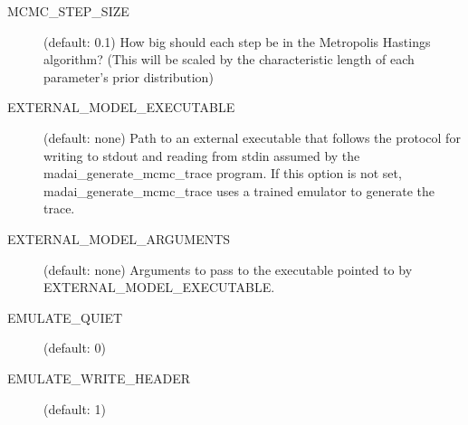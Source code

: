 \begin{description}
    \item[MCMC\_STEP\_SIZE] (default: 0.1) How big should each step be in the Metropolis Hastings algorithm? (This will be scaled by the characteristic length of each parameter's prior distribution)
    \item[EXTERNAL\_MODEL\_EXECUTABLE] (default: none) Path to an external executable that follows the protocol for writing to stdout and reading from stdin assumed by the madai\_generate\_mcmc\_trace program. If this option is not set, madai\_generate\_mcmc\_trace uses a trained emulator to generate the trace.
    \item[EXTERNAL\_MODEL\_ARGUMENTS] (default: none) Arguments to pass to the executable pointed to by EXTERNAL\_MODEL\_EXECUTABLE.
    \item[EMULATE\_QUIET] (default: 0)
    \item[EMULATE\_WRITE\_HEADER] (default: 1)
\end{description}

